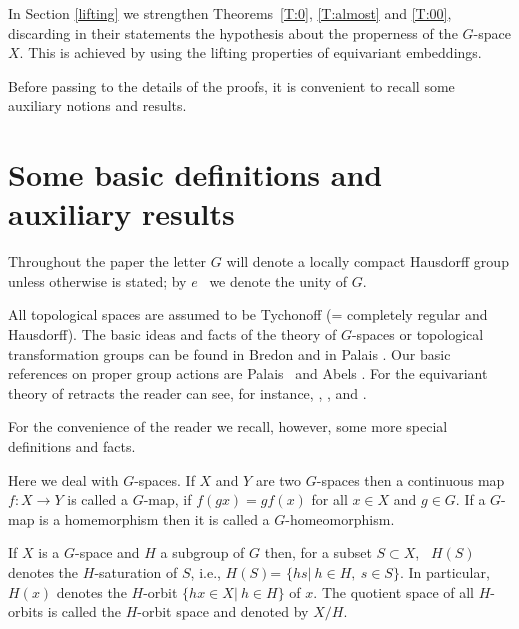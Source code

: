 \documentclass{amsart}
\begin{document}
        \medskip
        
        In Section \ref{lifting}   we strengthen  
 Theorems~\ref{T:0}, \ref{T:almost} and \ref{T:00},  discarding  in their statements the hypothesis about the properness of the $G$-space $X$. This is achieved by using the lifting properties of equivariant embeddings.
    
        
        
        \medskip
        
Before passing to the details of the proofs, it is convenient to recall some auxiliary notions and results.
 
\medskip



\section {Some basic definitions and auxiliary results}\label{def}

Throughout the paper the letter $G$ will denote a locally compact Hausdorff group unless otherwise is stated; by $e$ \ we  denote the unity of $G$. 

All topological spaces  are assumed to be Tychonoff (= completely regular and Hausdorff). 
The basic ideas and facts of the theory of $G$-spaces or topological
transformation groups can be found in Bredon \cite{bre:72} and in  Palais \cite{pal:60}.  
Our basic references on  proper group actions are   Palais~\cite{pal:61} and Abels   \cite{abe:78}.        
For the  equivariant theory of retracts the reader can see, for instance, \cite{ant:87},  \cite{ant:88} \cite{ant:99}, \cite{ant:jap} and \cite{ant:proper}. 

For the  convenience of the reader we recall, however,  some more  special definitions and facts.

\smallskip

Here we deal with $G$-spaces. If $X$ and $Y$ are two $G$-spaces then a continuous map $f:X\to Y$ is called a $G$-map, if $f(gx)=gf(x)$ for all $x\in X$ and $g\in G$. If a $G$-map is a homemorphism then it is called a $G$-homeomorphism. 




If $X$ is a $G$-space and $H$ a subgroup of $G$ then, for a subset $S\subset X$, \ $H(S)$ denotes the $H$-saturation of $S$, i.e., $H(S)$= $\{hs | \ h\in H,\ s\in S\}$. In particular, $H(x)$  denotes the $H$-orbit $\{hx\in X | \ h\in H \}$ of $x$.  The quotient space  of all $H$-orbits is called the $H$-orbit space and denoted by $X/H$. 
\end{document}
